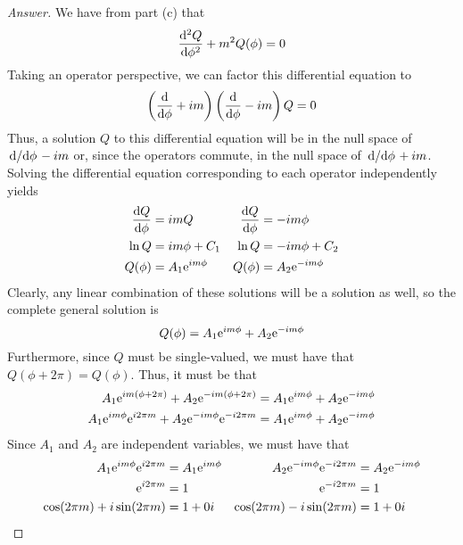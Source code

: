 \documentclass[../psets.tex]{subfiles}
\begin{document}
\begin{enumerate}
\begin{enumerate}
\begin{proof}[Answer]
            We have from part (c) that
            \begin{equation*}
                \dv[2]{Q}{\phi}+m^2Q(\phi) = 0
            \end{equation*}
            Taking an operator perspective, we can factor this differential equation to
            \begin{equation*}
                \left( \dv{\phi}+im \right)\left( \dv{\phi}-im \right)Q = 0
            \end{equation*}
            Thus, a solution $Q$ to this differential equation will be in the null space of $\dv*{\phi}-im$ or, since the operators commute, in the null space of $\dv*{\phi}+im$. Solving the differential equation corresponding to each operator independently yields
            \begin{align*}
                \dv{Q}{\phi} &= imQ&
                    \dv{Q}{\phi} &= -im\phi\\
                \ln Q &= im\phi+C_1&
                    \ln Q &= -im\phi+C_2\\
                Q(\phi) &= A_1\e[im\phi]&
                    Q(\phi) &= A_2\e[-im\phi]
            \end{align*}
            Clearly, any linear combination of these solutions will be a solution as well, so the complete general solution is
            \begin{equation*}
                Q(\phi) = A_1\e[im\phi]+A_2\e[-im\phi]
            \end{equation*}
            Furthermore, since $Q$ must be single-valued, we must have that $Q(\phi+2\pi)=Q(\phi)$. Thus, it must be that
            \begin{align*}
                A_1\e[im(\phi+2\pi)]+A_2\e[-im(\phi+2\pi)] &= A_1\e[im\phi]+A_2\e[-im\phi]\\
                A_1\e[im\phi]\e[i2\pi m]+A_2\e[-im\phi]\e[-i2\pi m] &= A_1\e[im\phi]+A_2\e[-im\phi]\\
            \end{align*}
            Since $A_1$ and $A_2$ are independent variables, we must have that
            \begin{align*}
                A_1\e[im\phi]\e[i2\pi m] &= A_1\e[im\phi]&
                    A_2\e[-im\phi]\e[-i2\pi m] &= A_2\e[-im\phi]\\
                \e[i2\pi m] &= 1&
                    \e[-i2\pi m] &= 1\\
                \cos(2\pi m)+i\sin(2\pi m) &= 1+0i&
                    \cos(2\pi m)-i\sin(2\pi m) &= 1+0i\\

\end{align*}
\end{proof}
\end{enumerate}
\end{enumerate}
\end{document}
